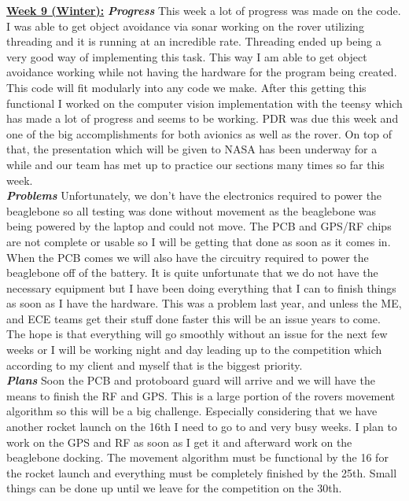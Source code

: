 \documentclass[onecolumn, draftclsnofoot, 10pt, compsoc]{IEEEtran}
\begin{document}
\underline{\textbf{Week 9 (Winter):}}
\newline\textbf{\textit{{Progress}}}
\newline This week a lot of progress was made on the code. I was able to get object avoidance via sonar working on the rover utilizing threading and it is running at an incredible rate. Threading ended up being a very good way of implementing this task. This way I am able to get object avoidance working while not having the hardware for the program being created. This code will fit modularly into any code we make. After this getting this functional I worked on the computer vision implementation with the teensy which has made a lot of progress and seems to be working. PDR was due this week and one of the big accomplishments for both avionics as well as the rover. On top of that, the presentation which will be given to NASA has been underway for a while and our team has met up to practice our sections many times so far this week. \\
\newline\textbf{\textit{{Problems}}}
\newline Unfortunately, we don't have the electronics required to power the beaglebone so all testing was done without movement as the beaglebone was being powered by the laptop and could not move. The PCB and GPS/RF chips are not complete or usable so I will be getting that done as soon as it comes in. When the PCB comes we will also have the circuitry required to power the beaglebone off of the battery. It is quite unfortunate that we do not have the necessary equipment but I have been doing everything that I can to finish things as soon as I have the hardware. This was a problem last year, and unless the ME, and ECE teams get their stuff done faster this will be an issue years to come. The hope is that everything will go smoothly without an issue for the next few weeks or I will be working night and day leading up to the competition which according to my client and myself that is the biggest priority. \\
\newline\textbf{\textit{{Plans}}}
\newline Soon the PCB and protoboard guard will arrive and we will have the means to finish the RF and GPS. This is a large portion of the rovers movement algorithm so this will be a big challenge. Especially considering that we have another rocket launch on the 16th I need to go to and very busy weeks. I plan to work on the GPS and RF as soon as I get it and afterward work on the beaglebone docking. The movement algorithm must be functional by the 16 for the rocket launch and everything must be completely finished by the 25th. Small things can be done up until we leave for the competition on the 30th. \newline
\end{document}
